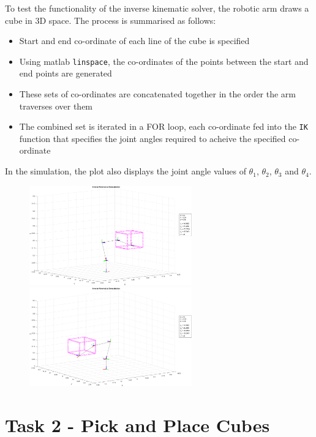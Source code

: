 \documentclass[9pt, a4paper]{article}
\begin{document}
To test the functionality of the inverse kinematic solver, the robotic arm draws
a cube in 3D space. The process is summarised as follows: 
\begin{itemize}
  \item Start and end co-ordinate of each line of the cube is specified 
  \item Using matlab \verb+linspace+, the co-ordinates of the points between the
  start and end points are generated 
  \item These sets of co-ordinates are concatenated together in the order the
  arm traverses over them 
  \item The combined set is iterated in a FOR loop, each co-ordinate fed into
  the \verb+IK+ function that specifies the joint angles required to acheive
  the specified co-ordinate
\end{itemize}


In the simulation, the plot also displays the joint angle values of $\theta_1$,
$\theta_2$, $\theta_3$ and $\theta_4$. 
\begin{figure}[h]
    \centering
    \includegraphics[width=7cm]{6}
    \hspace{1cm}
    \includegraphics[width=7cm]{7}
\end{figure}

\vfill
\pagebreak

\section{Task 2 - Pick and Place Cubes}
\end{document}
